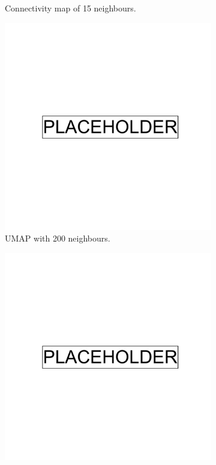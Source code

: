 \begin{figure}[h!]
\begin{subfigure}[b]{0.4\linewidth}
    \caption{Connectivity map of 15 neighbours.}
    \label{fig:UMAP_low_NN_connectivity}
  \end{subfigure}
  \begin{subfigure}[b]{0.4\linewidth}
    \includegraphics[width=\linewidth]{placeholder.png}
    \caption{UMAP with 200 neighbours.}
    \label{fig:UMAP_high_NN_1KGP}
  \end{subfigure}
  \begin{subfigure}[b]{0.4\linewidth}
    \includegraphics[width=\linewidth]{placeholder.png}

\end{subfigure}
\end{figure}
